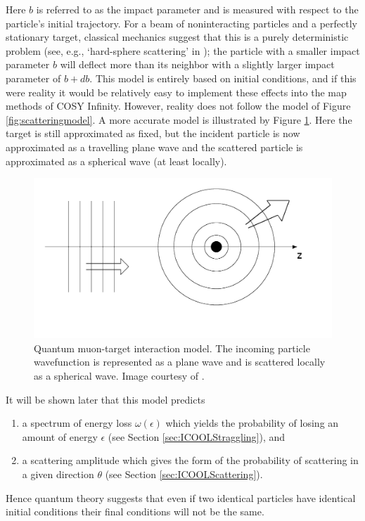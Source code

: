 Here $b$ is referred to as the impact parameter and is measured with respect to the particle's initial trajectory. For a beam of noninteracting particles and a perfectly stationary target, classical mechanics suggest that this is a purely deterministic problem (see, e.g., `hard-sphere scattering' in \cite{griffithsqm}); the particle with a smaller impact parameter $b$ will deflect more than its neighbor with a slightly larger impact parameter of $b+db$. This model is entirely based on initial conditions, and if this were reality it would be relatively easy to implement these effects into the map methods of COSY Infinity. However, reality does not follow the model of Figure \ref{fig:scatteringmodel}. A more accurate model is illustrated by Figure \ref{fig:scatteringmodel2}. Here the target is still approximated as fixed, but the incident particle is now approximated as a travelling plane wave and the scattered particle is approximated as a spherical wave (at least locally).
\begin{figure}
  \centering
    \includegraphics[width=\textwidth]{Figures/scattering_model_2} 
  \caption{Quantum muon-target interaction model. The incoming particle wavefunction is represented as a plane wave and is scattered locally as a spherical wave. Image courtesy of \cite{griffithsqm}.}
  \label{fig:scatteringmodel2}
\end{figure}
It will be shown later that this model predicts 
\begin{enumerate}
\item a spectrum of energy loss $\omega(\epsilon)$ which yields the probability of losing an amount of energy $\epsilon$ (see Section \ref{sec:ICOOLStraggling}), and
\item a scattering amplitude which gives the form of the probability of scattering in a given direction $\theta$ (see Section \ref{sec:ICOOLScattering}).
\end{enumerate}
Hence quantum theory suggests that even if two identical particles have identical initial conditions their final conditions will not be the same.

